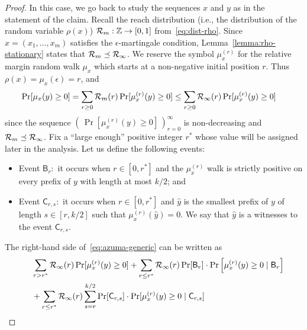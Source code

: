 \begin{proof}
\newcommand{\muxr}{\mu_x^{(r)}}
\newcommand{\Snr}{S_k^{(r)}}
\newcommand{\Sr}{S^{(r)}}
\newcommand{\Srstar}{S^{(r^*)}}
\newcommand{\event}[1]{\mathsf{#1}}
\newcommand{\notevent}[1]{\overline{\event{#1}}}

In this case, we go back to study the sequences $x$ and $y$ as in the statement of the claim.
Recall the reach distribution (i.e., the distribution of the random variable $\rho(x)$) 
$\mathcal{R}_m : \mathbb{Z} \rightarrow [0,1]$ from~\eqref{eq:dist-rho}. 
Since $x = (x_1, \ldots, x_m)$ satisfies the $\epsilon$-martingale condition, 
Lemma~\ref{lemma:rho-stationary} states that $\mathcal{R}_m \preceq \mathcal{R}_\infty$.
We reserve the symbol $\muxr$ for the relative margin 
random walk $\mu_x$ which starts at a non-negative initial position $r$. 
Thus $\rho(x) = \mu_x(\epsilon) = r$, and
\begin{align}\label{eq:azuma-generic}
\Pr[\mu_x(y) \geq 0] 
&= \sum_{r \geq 0}{\DistRho_m(r) \Pr[\muxr(y) \geq 0]} 
\leq \sum_{r \geq 0}{\StationaryRho(r) \Pr[\muxr(y) \geq 0]} 
\, 
\end{align}
since the sequence $( \, \Pr[\muxr(y) \geq 0] \, )_{r=0}^\infty$ is non-decreasing and $\mathcal{R}_m \preceq \mathcal{R}_\infty$. Fix a ``large enough'' positive integer $r^*$ whose value will be assigned later in the analysis. 
Let us define the following events:
 \begin{itemize}
  \item Event $\event{B}_r$:~it occurs when $r \in [0, r^*]$ and the $\muxr$ walk is strictly positive on every prefix of $y$ with length at most $k/2$; and 
  \item Event $\event{C}_{r,s}$:~it occurs when $r \in [0, r^*]$ and 
  $\hat{y}$ is the smallest prefix of $y$ of length $s \in [r, k/2]$ 
  such that $\muxr(\hat{y}) = 0$. 
  We say that $\hat{y}$ is a witnesses to the event $\event{C}_{r, s}$.
\end{itemize}
The right-hand side of~\eqref{eq:azuma-generic} can be written as
\begin{align*}
     &\quad \sum_{r>r^*}{\StationaryRho(r) \Pr[\muxr(y) \geq 0]} 
		+ \sum_{r \leq r^*}{\StationaryRho(r) \Pr[\event{B}_r] \cdot \Pr\left[\muxr(y) \geq 0 \mid \event{B}_r\right]} \\
    &\quad+ \sum_{r \leq r^*}{\StationaryRho(r) \sum_{s = r}^{k/2}{\Pr[\event{C}_{r,s}] \cdot \Pr[\muxr(y) \geq 0 \mid \event{C}_{r,s}]} }

\end{align*}
\end{proof}
